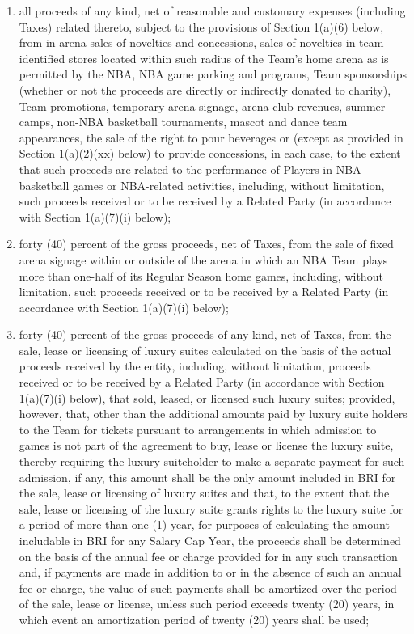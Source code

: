 \documentclass[
]{book}
\begin{document}
\begin{enumerate}
\begin{enumerate}
\begin{enumerate}
    \item
      all proceeds of any kind, net of reasonable and customary expenses (including Taxes) related thereto, subject to the provisions of Section 1(a)(6) below, from in-arena sales of novelties and concessions, sales of novelties in team-identified stores located within such radius of the Team's home arena as is permitted by the NBA, NBA game parking and programs, Team sponsorships (whether or not the proceeds are directly or indirectly donated to charity), Team promotions, temporary arena signage, arena club revenues, summer camps, non-NBA basketball tournaments, mascot and dance team appearances, the sale of the right to pour beverages or (except as provided in Section 1(a)(2)(xx) below) to provide concessions, in each case, to the extent that such proceeds are related to the performance of Players in NBA basketball games or NBA-related activities, including, without limitation, such proceeds received or to be received by a Related Party (in accordance with Section 1(a)(7)(i) below);
    \item
      forty (40) percent of the gross proceeds, net of Taxes, from the sale of fixed arena signage within or outside of the arena in which an NBA Team plays more than one-half of its Regular Season home games, including, without limitation, such proceeds received or to be received by a Related Party (in accordance with Section 1(a)(7)(i) below);
    \item
      forty (40) percent of the gross proceeds of any kind, net of Taxes, from the sale, lease or licensing of luxury suites calculated on the basis of the actual proceeds received by the entity, including, without limitation, proceeds received or to be received by a Related Party (in accordance with Section 1(a)(7)(i) below), that sold, leased, or licensed such luxury suites; provided, however, that, other than the additional amounts paid by luxury suite holders to the Team for tickets pursuant to arrangements in which admission to games is not part of the agreement to buy, lease or license the luxury suite, thereby requiring the luxury suiteholder to make a separate payment for such admission, if any, this amount shall be the only amount included in BRI for the sale, lease or licensing of luxury suites and that, to the extent that the sale, lease or licensing of the luxury suite grants rights to the luxury suite for a period of more than one (1) year, for purposes of calculating the amount includable in BRI for any Salary Cap Year, the proceeds shall be determined on the basis of the annual fee or charge provided for in any such transaction and, if payments are made in addition to or in the absence of such an annual fee or charge, the value of such payments shall be amortized over the period of the sale, lease or license, unless such period exceeds twenty (20) years, in which event an amortization period of twenty (20) years shall be used;

\end{enumerate}
\end{enumerate}
\end{enumerate}
\end{document}
